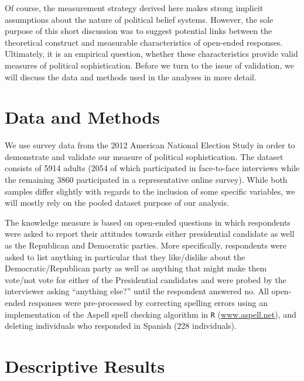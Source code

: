 \documentclass[12pt]{article}
\begin{document}
Of course, the measurement strategy derived here makes strong implicit assumptions about the nature of political belief systems. However, the sole purpose of this short discussion was to suggest potential links between the theoretical construct and measurable characteristics of open-ended responses. Ultimately, it is an empirical question, whether these characteristics provide valid measures of political sophistication. Before we turn to the issue of validation, we will discuss the data and methods used in the analyses in more detail.



\section{Data and Methods}

We use survey data from the 2012 American National Election Study in order to demonstrate and validate  our measure of political sophistication. The dataset consists of 5914 adults (2054 of which participated in face-to-face interviews while the remaining 3860 participated in a representative online survey). While both samples differ slightly with regards to the inclusion of some specific variables, we will mostly rely on the pooled dataset purpose of our analysis.

The knowledge measure is based on open-ended questions in which respondents were asked to report their attitudes towards either presidential candidate as well as the Republican and Democratic parties. More specifically, respondents were asked to list anything in particular that they like/dislike about the Democratic/Republican party as well as anything that might make them vote/not vote for either of the Presidential candidates and were probed by the interviewer asking ``anything else?'' until the respondent answered no. All open-ended responses were pre-processed by correcting spelling errors using an implementation of the Aspell spell checking algorithm in \texttt{R} (\url{www.aspell.net}), and deleting individuals who responded in Spanish (228 individuals).


\section{Descriptive Results}
\end{document}
